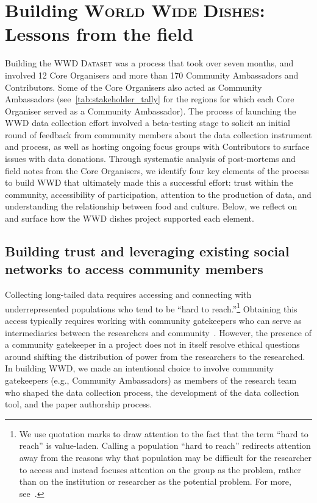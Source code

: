  \section{Building \textsc{World Wide Dishes}: Lessons from the field}\label{sec:rollout}



Building the \textsc{WWD Dataset} was a process that took over seven months, and involved 12 Core Organisers and more than 170 Community Ambassadors and Contributors. Some of the Core Organisers also acted as Community Ambassadors (see~\cref{tab:stakeholder_tally} for the regions for which each Core Organiser served as a Community Ambassador). The process of launching the \textsc{WWD} data collection effort involved a beta-testing stage to solicit an initial round of feedback from community members about the data collection instrument and process, as well as hosting ongoing focus groups with Contributors to surface issues with data donations. Through systematic analysis of post-mortems and field notes from the Core Organisers, we identify four key elements of the process to build \textsc{WWD} that ultimately made this a successful effort: trust within the community, accessibility of participation, attention to the production of data, and understanding the relationship between food and culture. Below, we reflect on and surface how the \textsc{WWD} dishes project supported each element.  

\subsection{Building trust and leveraging existing social networks to access community members}
Collecting long-tailed data requires accessing and connecting with underrepresented populations who tend to be ``hard to reach.''\footnote{We use quotation marks to draw attention to the fact that the term ``hard to reach'' is value-laden. Calling a population ``hard to reach'' redirects attention away from the reasons why that population may be difficult for the researcher to access and instead focuses attention on the group as the problem, rather than on the institution or researcher as the potential problem. For more, see~\cite{benjamin2016informed,epstein2008rise}.} Obtaining this access typically requires working with community gatekeepers who can serve as intermediaries between the researchers and community~\cite{le2015strangers,epstein2008rise}. However, the presence of a community gatekeeper in a project does not in itself resolve ethical questions around shifting the distribution of power from the researchers to the researched. In building \textsc{WWD}, we made an intentional choice to involve community gatekeepers (e.g., Community Ambassadors) as members of the research team who shaped the data collection process, the development of the data collection tool, and the paper authorship process.  

